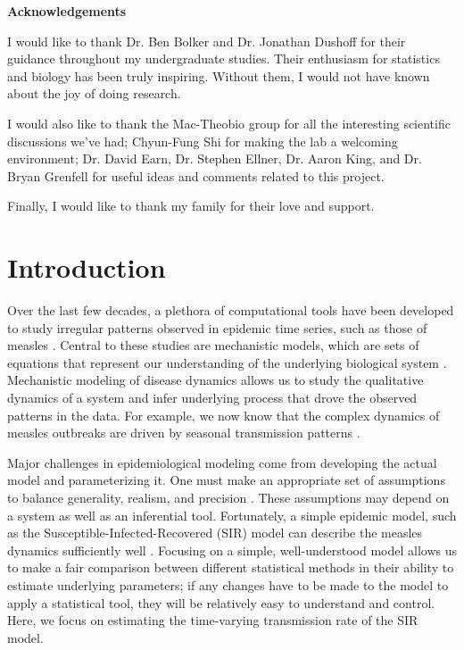 \documentclass{article}
\begin{document}
\pagebreak

\begin{center}
\textbf{Acknowledgements}
\end{center}

I would like to thank Dr. Ben Bolker and Dr. Jonathan Dushoff for their guidance throughout my undergraduate studies.
Their enthusiasm for statistics and biology has been truly inspiring.
Without them, I would not have known about the joy of doing research.

I would also like to thank the Mac-Theobio group for all the interesting scientific discussions we've had;
Chyun-Fung Shi for making the lab a welcoming environment;
Dr. David Earn, Dr. Stephen Ellner, Dr. Aaron King, and Dr. Bryan Grenfell for useful ideas and comments related to this project.

Finally, I would like to thank my family for their love and support.

\pagebreak

\tableofcontents

\pagebreak

\section{Introduction}

Over the last few decades, a plethora of computational tools have been developed to study irregular patterns observed in epidemic time series, such as those of measles \citep{fine1982measles, grenfell1994measles, finkenstadt2000time, cauchemez2008likelihood, hooker2010parameterizing, xia2011feature, king2015statistical, fasiolo2016comparison}.
Central to these studies are mechanistic models, which are sets of equations that represent our understanding of the underlying biological system \citep{breto2009time}.
Mechanistic modeling of disease dynamics allows us to study the qualitative dynamics of a system and infer underlying process that drove the observed patterns in the data.
For example, we now know that the complex dynamics of measles outbreaks are driven by seasonal transmission patterns \citep{earn2000simple, dalziel2016persistent}.

Major challenges in epidemiological modeling come from developing the actual model and parameterizing it.
One must make an appropriate set of assumptions to balance generality, realism, and precision \citep{levins1966strategy}.
These assumptions may depend on a system as well as an inferential tool.
Fortunately, a simple epidemic model, such as the Susceptible-Infected-Recovered (SIR) model can describe the measles dynamics sufficiently well \citep{earn2000simple, krylova2013effects, hempel2015century, dalziel2016persistent}.
Focusing on a simple, well-understood model allows us to make a fair comparison between different statistical methods in their ability to estimate underlying parameters;
if any changes have to be made to the model to apply a statistical tool, they will be relatively easy to understand and control.
Here, we focus on estimating the time-varying transmission rate of the SIR model.
\end{document}
